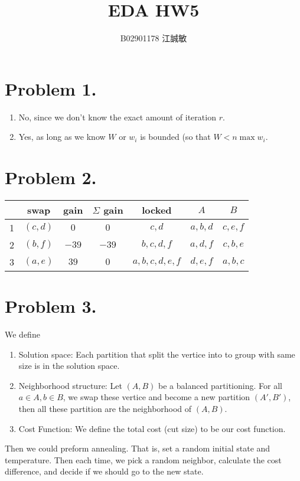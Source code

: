 \documentclass[12pt, a4paper]{article}
\title{EDA HW5}
\author{B02901178 江誠敏}
\begin{document}
\maketitle

\section{Problem 1.}
\begin{enumerate}
  \item No, since we don't know the exact amount of iteration $r$.
  \item Yes, as long as we know $W$ or $w_i$ is bounded (so that
    $W < n \max w_i$.
\end{enumerate}

\section{Problem 2.}
\begin{table}[H]
  \centering
\begin{tabular}{c|c|c|c|c|c|c}
  & swap & gain & $\Sigma$ gain & locked & $A$ & $B$ \\
  \hline
  1 & $(c, d)$ & $0$ & $0$ &$c, d$ & $a,b,d$ & $c, e, f$ \\
  \hline
  2 & $(b, f)$ & $-39$ & $-39$ & $b, c, d, f$ & $a,d,f$ & $c, b, e$ \\
  \hline
  3 & $(a, e)$ & $39$ & $0$ & $a,b,c,d,e,f$ & $d,e,f$ & $a, b, c$ \\
\end{tabular}
\end{table}

\section{Problem 3.}
We define
\begin{enumerate}
  \item Solution space: Each partition that split the vertice
    into to group with same size is in the solution space.
  \item Neighborhood structure: Let $(A, B)$ be a balanced
    partitioning. For all $a \in A, b \in B$, we swap these
    vertice and become a new partition $(A', B')$, then
    all these partition are the neighborhood of $(A, B)$.
  \item Cost Function: We define the total cost (cut size)
    to be our cost function.
\end{enumerate}
Then we could preform annealing. That is, set a random
initial state and temperature. Then each time, we
pick a random neighbor, calculate the cost difference,
and decide if we should go to the new state.
\end{document}
